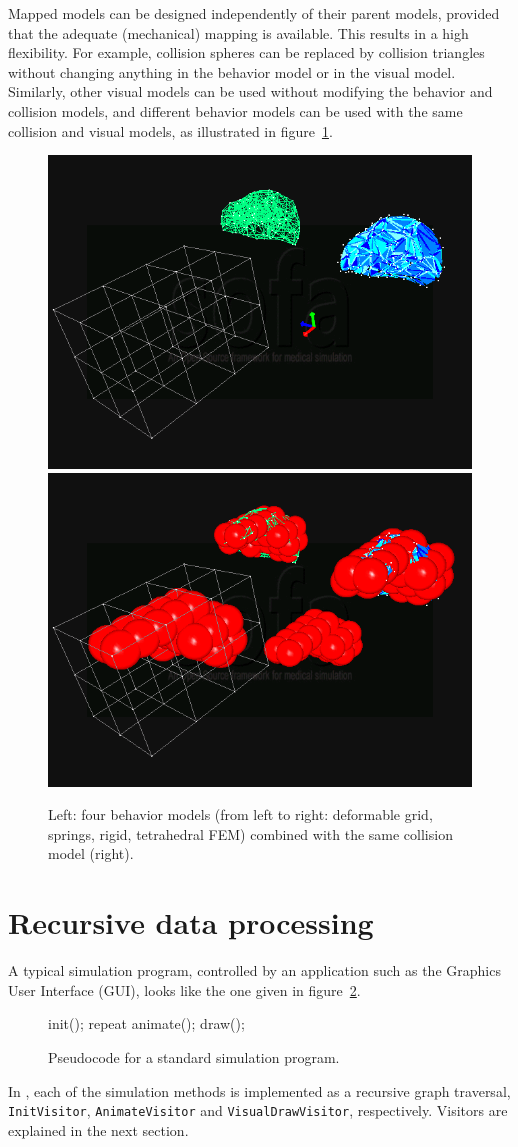 Mapped models can be designed independently of their parent models, provided that the adequate (mechanical) mapping is available. 
This results in a high flexibility. 
For example, collision spheres can be replaced by collision triangles without changing anything in the behavior model or in the visual model. 
Similarly, other visual models can be used without modifying the behavior and collision models, and different behavior models can be used with the same collision and visual models, as illustrated in figure~\ref{fig:behaviormodels}.

\begin{figure}
 \centering
 \includegraphics[width=0.4\linewidth]{demoLiverFall1.png}
 \includegraphics[width=0.4\linewidth]{demoLiverFall2.png}
 \caption{Left: four behavior models (from left to right: deformable grid, springs, rigid, tetrahedral FEM) combined with the same collision model (right).}
 \label{fig:behaviormodels}
\end{figure}


\section{Recursive data processing}
A typical simulation program, controlled by an application such as the Graphics User Interface (GUI), looks like the one given in figure~\ref{pc:animationloop}.
\begin{figure}
\begin{code_cpp}
init();
repeat {
    animate();
    draw();
}
\end{code_cpp}
\caption{Pseudocode for a standard simulation program.}
\label{pc:animationloop}
\end{figure}
In \sofa, each of the simulation methods is implemented as a recursive graph traversal, \texttt{InitVisitor}, \texttt{AnimateVisitor} and \texttt{VisualDrawVisitor}, respectively. 
Visitors are explained in the next section.

